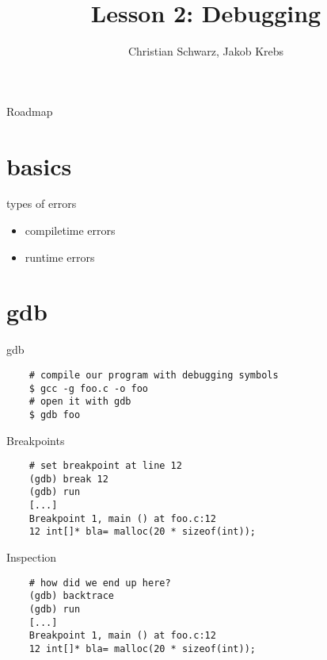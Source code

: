 \documentclass[10pt,graphics,aspectratio=169,table]{beamer}
\title{Lesson 2: Debugging} \author{Christian Schwarz, Jakob Krebs}
\begin{document}
\maketitle
\begin{frame}{Roadmap}
  \tableofcontents
\end{frame}
\section{basics}
\begin{frame}{types of errors}
  \begin{itemize}
  \item compiletime errors
  \item runtime errors
  \end{itemize}
\end{frame}
\section{gdb}
\begin{frame}[fragile]{gdb}
\begin{lstlisting}
    # compile our program with debugging symbols
    $ gcc -g foo.c -o foo
    # open it with gdb
    $ gdb foo
\end{lstlisting}
\end{frame}
\begin{frame}[fragile]{Breakpoints}
\begin{lstlisting}
    # set breakpoint at line 12
    (gdb) break 12
    (gdb) run
    [...]
    Breakpoint 1, main () at foo.c:12
    12 int[]* bla= malloc(20 * sizeof(int));
\end{lstlisting}
\end{frame}
\begin{frame}[fragile]{Inspection}
\begin{lstlisting}
    # how did we end up here?
    (gdb) backtrace
    (gdb) run
    [...]
    Breakpoint 1, main () at foo.c:12
    12 int[]* bla= malloc(20 * sizeof(int));
\end{lstlisting}
\end{frame}
\end{document}
